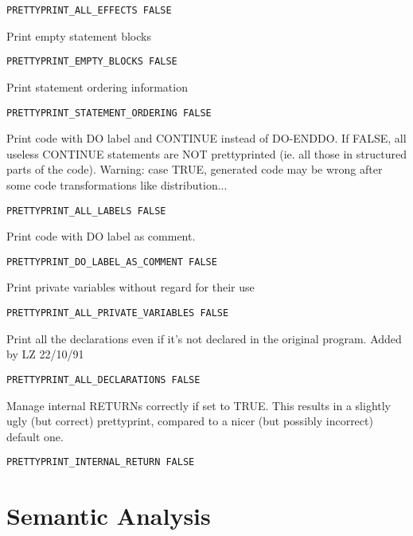 \begin{verbatim}
PRETTYPRINT_ALL_EFFECTS FALSE
\end{verbatim}

Print empty statement blocks

\begin{verbatim}
PRETTYPRINT_EMPTY_BLOCKS FALSE
\end{verbatim}

Print statement ordering information

\begin{verbatim}
PRETTYPRINT_STATEMENT_ORDERING FALSE
\end{verbatim}

Print code with DO label and CONTINUE instead of DO-ENDDO. If FALSE, all
useless CONTINUE statements are NOT prettyprinted (ie. all those in
structured parts of the code). Warning: case TRUE, generated code may be
wrong after some code transformations like distribution...

\begin{verbatim}
PRETTYPRINT_ALL_LABELS FALSE
\end{verbatim}

Print code with DO label as comment.

\begin{verbatim}
PRETTYPRINT_DO_LABEL_AS_COMMENT FALSE
\end{verbatim}

Print private variables without regard for their use

\begin{verbatim}
PRETTYPRINT_ALL_PRIVATE_VARIABLES FALSE
\end{verbatim}


Print all the declarations even if it's not declared in the original program.
Added by LZ 22/10/91

\begin{verbatim}
PRETTYPRINT_ALL_DECLARATIONS FALSE
\end{verbatim}

Manage internal RETURNs correctly if set to TRUE.  This results in a
slightly ugly (but correct) prettyprint, compared to a nicer (but
possibly incorrect) default one.

\begin{verbatim}
PRETTYPRINT_INTERNAL_RETURN FALSE
\end{verbatim}

\section{Semantic Analysis}

